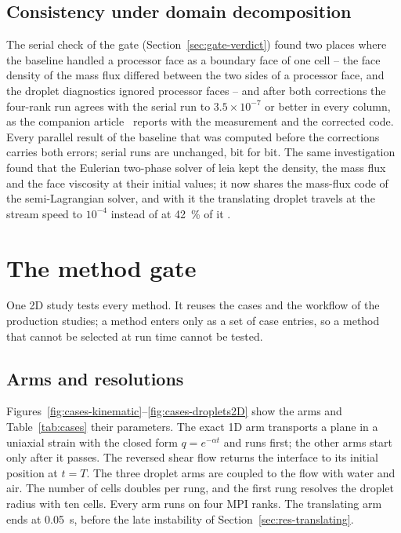 \documentclass[preprint,3p,11pt]{elsarticle}
\begin{document}
\subsection{Consistency under domain decomposition}
\label{sec:fv-parallel}
The serial check of the gate (Section~\ref{sec:gate-verdict}) found two places where the
baseline handled a processor face as a boundary face of one cell -- the face density of the
mass flux differed between the two sides of a processor face, and the droplet diagnostics
ignored processor faces -- and after both corrections the four-rank run agrees with the
serial run to $3.5\times10^{-7}$ or better in every column, as the companion
article~\cite{maric2026sl} reports with the measurement and the corrected code. Every
parallel result of the baseline that was computed before the corrections carries both
errors; serial runs are unchanged, bit for bit. The same investigation found that the
Eulerian two-phase solver of leia kept the density, the mass flux and the face viscosity
at their initial values; it now shares the mass-flux code of the semi-Lagrangian solver,
and with it the translating droplet travels at the stream speed to $10^{-4}$ instead of at
\SI{42}{\percent} of it \cite{maric2026sl}.

\section{The method gate}
\label{sec:gate}

One 2D study tests every method. It reuses the cases and the workflow of the
production studies; a method enters only as a set of case entries, so a method that
cannot be selected at run time cannot be tested.

\subsection{Arms and resolutions}
\label{sec:gate-arms}
Figures~\ref{fig:cases-kinematic}--\ref{fig:cases-droplets2D} show the arms and
Table~\ref{tab:cases} their parameters. The exact 1D arm transports a plane in a uniaxial
strain with the closed form $q=e^{-\alpha t}$ and runs first; the other arms start only
after it passes. The reversed shear flow returns the interface to its initial position at
$t=T$. The three droplet arms are coupled to the flow with water and air. The number of
cells doubles per rung, and the first rung resolves the droplet radius with ten cells.
Every arm runs on four MPI ranks. The translating arm ends at \SI{0.05}{s}, before the
late instability of Section~\ref{sec:res-translating}.
\end{document}
